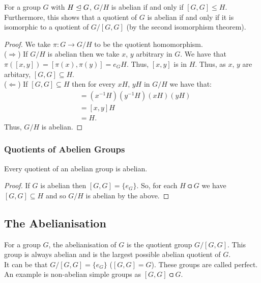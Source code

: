 For a group $G$ with $H \trianglelefteq G$, $G/H$ is abelian if and only if 
$[G, G] \leq H$. Furthermore, this shows that a quotient of $G$
is abelian if and only if it is isomorphic to a quotient of $G/[G, G]$
(by the second isomorphism theorem).

\begin{proof}
    We take $\pi : G \to G/H$ to be the quotient homomorphism.
    \\[\baselineskip]
    ($\Rightarrow$) 
    If $G/H$ is abelian then we take $x$, $y$ arbitrary in $G$. 
    We have that $\pi([x, y]) = [\pi(x), \pi(y)] = e_GH$. 
    Thus, $[x, y]$ is in $H$. 
    Thus, as $x$, $y$ are arbitary, $[G, G] \subseteq H$.
    \\[\baselineskip]
    ($\Leftarrow$)
    If $[G, G] \subseteq H$ then for every $xH$, $yH$ in $G/H$ we have
    that: \begin{align*}
        [xH, yH] &= (x^{-1}H)(y^{-1}H)(xH)(yH) \\
        &= [x, y]H \\
        &= H.
    \end{align*} Thus, $G/H$ is abelian.
\end{proof}

\subsubsection{Quotients of Abelien Groups}

Every quotient of an abelian group is abelian.

\begin{proof}
    If $G$ is abelian then $[G, G] = \{e_G\}$. So, for each $H \csub G$
    we have $[G, G] \subseteq H$ and so $G/H$ is abelian by the above.
\end{proof}

\subsection{The Abelianisation}

For a group $G$, the abelianisation of $G$ is the quotient group 
$G/[G, G]$. This group is always abelian and is the largest possible
abelian quotient of $G$.
\\[\baselineskip]
It can be that $G/[G, G] = \{e_G\}$ ($[G, G] = G$). These groups are
called perfect. An example is non-abelian simple groups as $[G, G] \csub G$.
